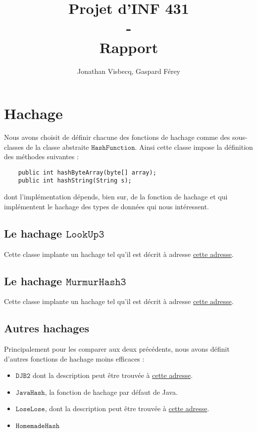 \documentclass[12pt,a4paper,titlepage]{article}
\author{Jonathan Visbecq, Gaspard Férey}
\title{Projet d'INF 431 \\ - \\ Rapport}
\newcommand{\class}[1]{$\mathtt{#1}$}
\begin{document}
\maketitle

\section{Hachage}

Nous avons choisit de définir chacune des fonctions de hachage comme des sous-classes de la classe abstraite \class{HashFunction}.
Ainsi cette classe impose la définition des méthodes suivantes :
\begin{lstlisting}
	public int hashByteArray(byte[] array);
	public int hashString(String s);
\end{lstlisting}
dont l'implémentation dépends, bien sur, de la fonction de hachage et qui implémentent le hachage des types de données qui nous intéressent.

\subsection{Le hachage \class{LookUp3}}
Cette classe implante un hachage tel qu'il est décrit à adresse \href{http://www.burtleburtle.net/bob/c/lookup3.c}{cette adresse}.

\subsection{Le hachage \class{MurmurHash3}}
Cette classe implante un hachage tel qu'il est décrit à adresse \href{http://en.wikipedia.org/wiki/MurmurHash}{cette adresse}.

\subsection{Autres hachages}
Principalement pour les comparer aux deux précédents, nous avons définit d'autres fonctions de hachage moins efficaces :
\begin{itemize}
\item \class{DJB2} dont la description peut être trouvée à \href{http://www.cse.yorku.ca/~oz/hash.html}{cette adresse}.
\item \class{JavaHash}, la fonction de hachage par défaut de Java.
\item \class{LoseLose}, dont la description peut être trouvée à \href{http://www.cse.yorku.ca/~oz/hash.html}{cette adresse}.
\item \class{HomemadeHash} 
\end{itemize}
\end{document}
